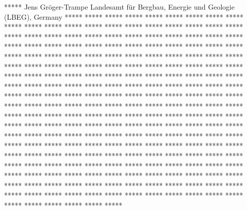 \begin{conf-abstract}
{*****}
{Jens Gröger-Trampe}
{Landesamt für Bergbau, Energie und Geologie (LBEG), Germany}
{***** ***** ***** ***** ***** ***** ***** ***** ***** ***** ***** ***** ***** ***** ***** ***** ***** ***** ***** ***** ***** ***** ***** ***** ***** ***** ***** ***** ***** ***** ***** ***** ***** ***** ***** ***** ***** ***** ***** ***** ***** ***** ***** ***** ***** ***** ***** ***** ***** ***** ***** ***** ***** ***** ***** ***** ***** ***** ***** ***** ***** ***** ***** ***** ***** ***** ***** ***** ***** ***** ***** ***** ***** ***** ***** ***** ***** ***** ***** ***** ***** ***** ***** ***** ***** ***** ***** ***** ***** ***** ***** ***** ***** ***** ***** ***** ***** ***** ***** ***** ***** ***** ***** ***** ***** ***** ***** ***** ***** ***** ***** ***** ***** ***** ***** ***** ***** ***** ***** ***** ***** ***** ***** ***** ***** ***** ***** ***** ***** ***** ***** ***** ***** ***** ***** ***** ***** ***** ***** ***** ***** ***** ***** ***** ***** ***** ***** ***** ***** ***** ***** ***** ***** ***** ***** ***** ***** ***** ***** ***** ***** ***** ***** ***** ***** ***** ***** ***** ***** ***** ***** ***** ***** ***** ***** ***** ***** ***** ***** ***** ***** ***** ***** ***** ***** ***** ***** ***** ***** ***** ***** ***** ***** ***** ***** ***** ***** ***** ***** ***** ***** ***** ***** ***** ***** ***** ***** ***** ***** ***** ***** ***** ***** ***** ***** ***** ***** ***** ***** ***** ***** ***** ***** ***** ***** ***** ***** ***** ***** ***** *****}

\end{conf-abstract}
